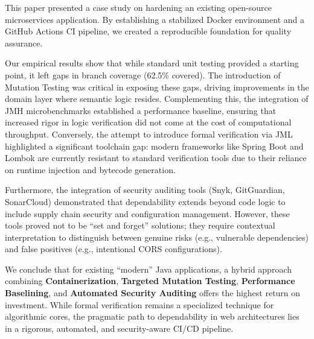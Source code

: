 This paper presented a case study on hardening an existing open-source microservices application. By establishing a stabilized Docker environment and a GitHub Actions CI pipeline, we created a reproducible foundation for quality assurance.

Our empirical results show that while standard unit testing provided a starting point, it left gaps in branch coverage (62.5\% covered). The introduction of Mutation Testing was critical in exposing these gaps, driving improvements in the domain layer where semantic logic resides. Complementing this, the integration of JMH microbenchmarks established a performance baseline, ensuring that increased rigor in logic verification did not come at the cost of computational throughput. Conversely, the attempt to introduce formal verification via JML highlighted a significant toolchain gap: modern frameworks like Spring Boot and Lombok are currently resistant to standard verification tools due to their reliance on runtime injection and bytecode generation.

Furthermore, the integration of security auditing tools (Snyk, GitGuardian, SonarCloud) demonstrated that dependability extends beyond code logic to include supply chain security and configuration management. However, these tools proved not to be ``set and forget'' solutions; they require contextual interpretation to distinguish between genuine risks (e.g., vulnerable dependencies) and false positives (e.g., intentional CORS configurations).

We conclude that for existing ``modern'' Java applications, a hybrid approach combining \textbf{Containerization}, \textbf{Targeted Mutation Testing}, \textbf{Performance Baselining}, and \textbf{Automated Security Auditing} offers the highest return on investment. While formal verification remains a specialized technique for algorithmic cores, the pragmatic path to dependability in web architectures lies in a rigorous, automated, and security-aware CI/CD pipeline.